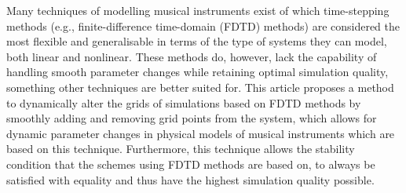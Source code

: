 Many techniques of modelling musical instruments exist of which time-stepping methods (e.g., finite-difference time-domain (FDTD) methods) are considered the most flexible and generalisable in terms of the type of systems they can model, both linear and nonlinear. These methods do, however, lack the capability of handling smooth parameter changes while retaining optimal simulation quality, something other techniques are better suited for. This article proposes a method to dynamically alter the grids of simulations based on FDTD methods by smoothly adding and removing grid points from the system, which allows for dynamic parameter changes in physical models of musical instruments which are based on this technique. Furthermore, this technique allows the stability condition that the schemes using FDTD methods are based on, to always be satisfied with equality and thus have the highest simulation quality possible.  